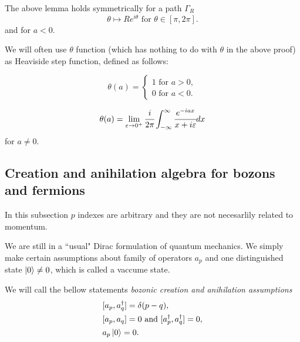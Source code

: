 \documentclass[main.tex]{subfiles}
\begin{document}
\begin{corollary}
The above lemma holds symmetrically for a path $\Gamma_R$
\begin{equation}
\theta \mapsto Re^{i\theta} \text{ for } \theta\in[\pi, 2\pi].
\end{equation}
and for $a < 0$.
\end{corollary}


We will often use $\theta$ function (which has nothing to do with $\theta$ in the above proof) as Heaviside step function, defined as follows:

\begin{equation}
\theta(a) = 
\begin{cases}
1 \text{ for } a > 0,\\
0 \text{ for } a < 0.
\end{cases}
\end{equation}
\begin{proposition}
\begin{equation}
\theta(a) = \lim\limits_{\epsilon\to 0^+} \cfrac{i}{2\pi} \int_{-\infty}^\infty  \cfrac{e^{-iax}}{x + i\epsilon} dx
\end{equation}
for $a\not=0$.
\end{proposition}
\subsection{Creation and anihilation algebra for bozons and fermions}
In this subsection $p$ indexes are arbitrary and they are not necesarlily related to momentum. 

We are still in a ``usual" Dirac formulation of quantum mechanics. We simply make certain assumptions about family of operators $a_p$ and one distinguished state    $\ket{0} \not= 0$, which is called a vaccume state.

\begin{definition}
We will call the bellow statements \textit{bozonic creation and anihilation assumptions}
\begin{align}
& [a_p, a^\dagger_q] = \delta(p - q),\\
& [a_p, a_q] = 0 \text{ and } [a^\dagger_p, a^\dagger_q] = 0,\\
& a_p\ket{0} = 0.
\end{align}
\end{definition}
\end{document}
